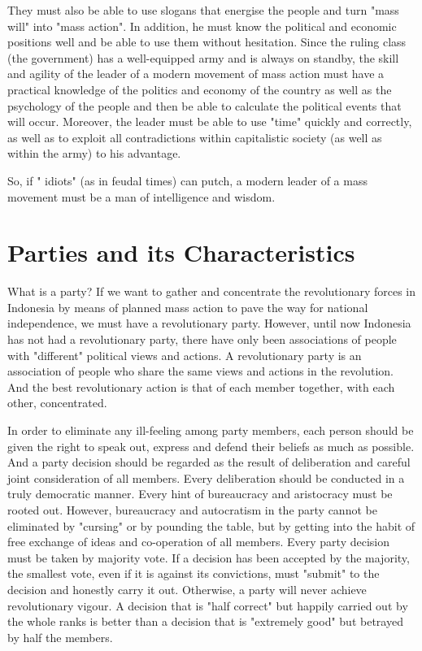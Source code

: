 They must also be able to use slogans that energise the people and turn "mass will" into "mass action". In addition, he must know the 
political and economic positions well and be able to use them without hesitation. Since the ruling class (the government) 
has a well-equipped army and is always on standby, the skill and agility of the leader of a modern movement of mass action must have a 
practical knowledge of the politics and economy of the country as well as the psychology of the people and then be able to calculate 
the political events that will occur. Moreover, the leader must be able to use "time" quickly and correctly, as well as to exploit all 
contradictions within capitalistic society (as well as within the army) to his advantage.\nline

So, if " idiots" (as in feudal times) can putch, a modern leader of a mass movement must be a man of intelligence and wisdom.\nline

\section{Parties and its Characteristics}

What is a party? If we want to gather and concentrate the revolutionary forces in Indonesia by means of planned mass action to pave the 
way for national independence, we must have a revolutionary party. However, until now Indonesia has not had a revolutionary party, 
there have only been associations of people with "different" political views and actions. A revolutionary party is an association of 
people who share the same views and actions in the revolution. And the best revolutionary action is that of each member together, 
with each other, concentrated.\nline

In order to eliminate any ill-feeling among party members, each person should be given the right to speak out, express and defend 
their beliefs as much as possible. And a party decision should be regarded as the result of deliberation and careful joint consideration 
of all members. Every deliberation should be conducted in a truly democratic manner. Every hint of bureaucracy and aristocracy must be 
rooted out. However, bureaucracy and autocratism in the party cannot be eliminated by "cursing" or by pounding the table, but by getting 
into the habit of free exchange of ideas and co-operation of all members. Every party decision must be taken by majority vote. If a 
decision has been accepted by the majority, the smallest vote, even if it is against its convictions, must "submit" to the decision 
and honestly carry it out. Otherwise, a party will never achieve revolutionary vigour. A decision that is "half correct" but happily 
carried out by the whole ranks is better than a decision that is "extremely good" but betrayed by half the members.\nline

